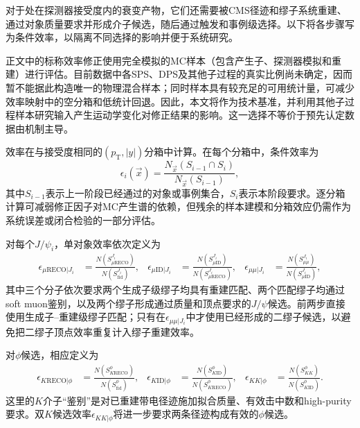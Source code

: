 对于处在探测器接受度内的衰变产物，它们还需要被CMS径迹和缪子系统重建、通过对象质量要求并形成介子候选，随后通过触发和事例级选择。以下将各步骤写为条件效率，以隔离不同选择的影响并便于系统研究。

正文中的标称效率修正使用完全模拟的\DPSone MC样本（包含产生子、探测器模拟和重建）进行评估。目前数据中各SPS、DPS及其他子过程的真实比例尚未确定，因而暂不能据此构造唯一的物理混合样本；同时\DPSone 样本具有较充足的可用统计量，可减少效率映射中的空分箱和低统计回退。因此，本文将\DPSone 作为技术基准，并利用其他子过程样本研究输入产生运动学变化对修正结果的影响。这一选择不等价于预先认定数据由\DPSone 机制主导。

效率在与接受度相同的$(p_{\mathrm T}, |y|)$分箱中计算。在每个分箱中，条件效率为
\begin{equation}
\label{eq:step-efficiency}
\epsilon_i(\vec{x})
=
\frac{N_{\vec{x}}(S_{i-1}\cap S_i)}
     {N_{\vec{x}}(S_{i-1})},
\end{equation}
其中$S_{i-1}$表示上一阶段已经通过的对象或事例集合，$S_i$表示本阶段要求。逐分箱计算可减弱修正因子对MC产生谱的依赖，但残余的样本建模和分箱效应仍需作为系统误差或闭合检验的一部分评估。

对每个$J/\psi_i$，单对象效率依次定义为
\begin{align}
\epsilon_{\mu\mathrm{RECO}|J_i}
&=\frac{N(S_{\mu\mathrm{RECO}}^{J_i})}{N(S_{\mathrm{fid}}^{J_i})},
&
\epsilon_{\mu\mathrm{ID}|J_i}
&=\frac{N(S_{\mu\mathrm{ID}}^{J_i})}{N(S_{\mu\mathrm{RECO}}^{J_i})},
&
\epsilon_{\mu\mu|J_i}
&=\frac{N(S_{\mu\mu}^{J_i})}{N(S_{\mu\mathrm{ID}}^{J_i})},
\label{eq:jpsi-conditional-efficiencies}
\end{align}
其中三个分子依次要求两个生成子级缪子均具有重建匹配、两个匹配缪子均通过soft muon鉴别，以及两个缪子形成通过质量和顶点要求的$J/\psi$候选。前两步直接使用生成子--重建级缪子匹配；只有在$\epsilon_{\mu\mu|J_i}$中才使用已经形成的二缪子候选，以避免把二缪子顶点效率重复计入缪子重建效率。

对$\phi$候选，相应定义为
\begin{align}
\epsilon_{K\mathrm{RECO}|\phi}
&=\frac{N(S_{K\mathrm{RECO}}^\phi)}{N(S_{\mathrm{fid}}^\phi)},
&
\epsilon_{K\mathrm{ID}|\phi}
&=\frac{N(S_{K\mathrm{ID}}^\phi)}{N(S_{K\mathrm{RECO}}^\phi)},
&
\epsilon_{KK|\phi}
&=\frac{N(S_{KK}^\phi)}{N(S_{K\mathrm{ID}}^\phi)}.
\label{eq:phi-conditional-efficiencies}
\end{align}
这里的$K$介子“鉴别”是对已重建带电径迹施加拟合质量、有效击中数和high-purity要求。双$K$候选效率$\epsilon_{KK|\phi}$将进一步要求两条径迹构成有效的$\phi$候选。

